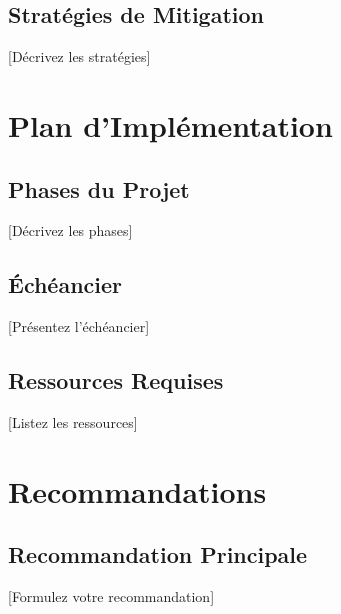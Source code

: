 \subsection{Stratégies de Mitigation}
[Décrivez les stratégies]




\section{Plan d'Implémentation}

\subsection{Phases du Projet}
[Décrivez les phases]

\subsection{Échéancier}
[Présentez l'échéancier]

\subsection{Ressources Requises}
[Listez les ressources]

\section{Recommandations}

\subsection{Recommandation Principale}
[Formulez votre recommandation]


